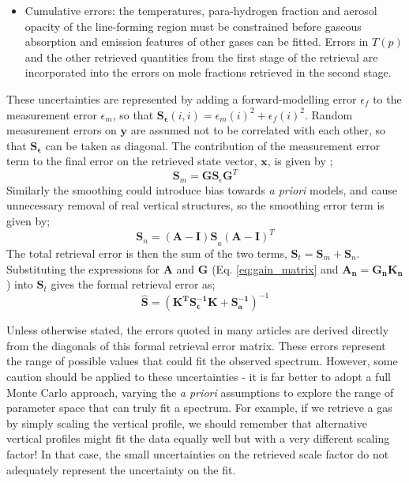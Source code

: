 \documentclass[final,5p,times,twocolumn,authoryear]{elsarticle}
\begin{document}
\begin{itemize}
\item Cumulative errors: the temperatures, para-hydrogen fraction and aerosol opacity of the line-forming region must be constrained before gaseous absorption and emission features of other gases can be fitted.  Errors in $T(p)$ and the other retrieved quantities from the first stage of the retrieval are incorporated into the errors on mole fractions retrieved in the second stage.
\end{itemize}

These uncertainties are represented by adding a forward-modelling error $\epsilon _{f}$ to the measurement error $\epsilon_{m}$, so that $\mathbf{S_{\epsilon }}(i,i)=\epsilon _{m}(i)^{2}+\epsilon_{f}(i)^{2}$. Random measurement errors on $\mathbf{y}$ are assumed not to be correlated with each other, so that $\mathbf{S_{\epsilon }}$ can be taken as diagonal.  The contribution of the measurement error term to the final error on the retrieved state vector, $\mathbf{x}$, is given by \citep{00rodgers};
\begin{equation}
\mathbf{S}_{m}\mathbf{=GS}_{\epsilon }\mathbf{G}^{T}
\end{equation}
Similarly the smoothing could introduce bias towards \textit{a priori} models, and cause unnecessary removal of real vertical structures, so the smoothing error term is given by;
\begin{equation}
\mathbf{S}_{n}\mathbf{=(A-I)S}_{a}\mathbf{(A-I)}^{T}
\end{equation}
The total retrieval error is then the sum of the two terms, $\mathbf{S}_{t}=\mathbf{S}_{m}+\mathbf{S}_{n}.$  Substituting the expressions for $\mathbf{A}$ and $\mathbf{G}$ (Eq. \ref{eq:gain_matrix} and $\mathbf{A_n=G_nK_n}$) into $\mathbf{S}_{t}$ gives the formal retrieval error as;
\begin{equation}
\widehat{\mathbf{S}}=\left(\mathbf{K^TS_\epsilon^{-1}K+S_a^{-1}} \right)^{-1}
\end{equation}

Unless otherwise stated, the errors quoted in many articles are derived directly from the diagonals of this formal retrieval error matrix.  These errors represent the range of possible values that could fit the observed spectrum.  However, some caution should be applied to these uncertainties - it is far better to adopt a full Monte Carlo approach, varying the \textit{a priori} assumptions to explore the range of parameter space that can truly fit a spectrum.  For example, if we retrieve a gas by simply scaling the vertical profile, we should remember that alternative vertical profiles might fit the data equally well but with a very different scaling factor!  In that case, the small uncertainties on the retrieved scale factor do not adequately represent the uncertainty on the fit.
\end{document}
